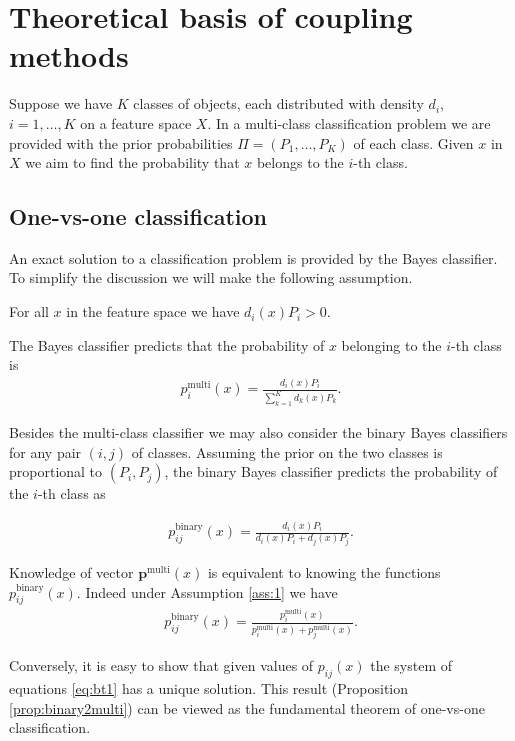 \section{Theoretical basis of coupling methods} \label{sec:theory}

Suppose we have $K$ classes of objects, each distributed with density $d_i$, $i=1,\ldots, K$ on a feature 
space $X$. In a multi-class classification problem we are provided with 
the prior probabilities $\Pi = (P_1, \ldots, P_K)$ of each class. Given $x$ in $X$ we aim to find 
the probability that $x$ belongs to the $i$-th class. 


\subsection{One-vs-one classification} \label{sec:one-vs-one}

An exact solution to a classification problem is provided by the Bayes classifier. To simplify the discussion we will make the following assumption.

\begin{assumption} \label{ass:1}
For all $x$ in the feature space we have $d_i(x) P_i > 0$.
\end{assumption}


The Bayes classifier predicts that the probability of $x$ belonging to the $i$-th class is
\begin{align}
 p^\textrm{multi}_i(x) = \frac{d_i(x) P_i}{\sum_{k=1}^K d_k(x)P_k}.
\end{align}

Besides the multi-class classifier we may also consider the binary Bayes classifiers for any pair $(i,j)$ of 
classes. Assuming the prior on the two classes is proportional to $(P_i, P_j)$, the binary Bayes classifier 
predicts the probability of the $i$-th class as 

\begin{align}
	p_{ij}^\textrm{binary}(x) = \frac{d_i(x) P_i}{d_i(x)P_i + d_j(x)P_j}.
\end{align}

Knowledge of vector $\boldsymbol{p}^\textrm{multi}(x)$ is equivalent to knowing the functions $p^\textrm{binary}_{ij}(x)$. Indeed under Assumption \ref{ass:1} we have
\begin{align}
p_{ij}^\textrm{binary}(x) = \frac{p_i^\textrm{multi}(x)}{p_i^\textrm{multi}(x) + p_j^\textrm{multi}(x)}. \label{eq:bt1}
\end{align}

Conversely, it is easy to show that  given values of $p_{ij}(x)$ the system of equations \eqref{eq:bt1} has a unique solution. This result (Proposition \ref{prop:binary2multi}) can be viewed as the fundamental theorem of one-vs-one classification.

